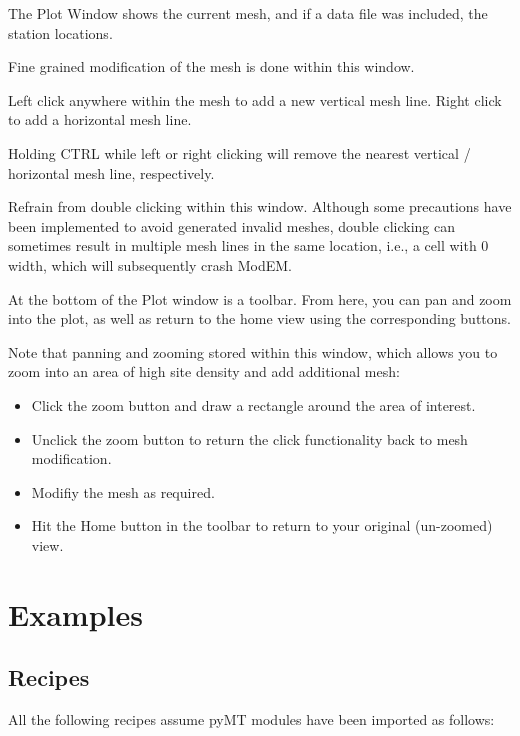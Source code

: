\documentclass[letterpaper,10pt,english]{sphinxmanual}
\begin{document}
The Plot Window shows the current mesh, and if a data file was included, the station locations.

Fine grained modification of the mesh is done within this window.

Left click anywhere within the mesh to add a new vertical mesh line. Right click to add a horizontal mesh line.

Holding CTRL while left or right clicking will remove the nearest vertical / horizontal mesh line, respectively.

Refrain from double clicking within this window. Although some precautions have been implemented to avoid generated invalid meshes, double clicking can sometimes result in multiple mesh lines in the same location, i.e., a cell with 0 width, which will subsequently crash ModEM.

At the bottom of the Plot window is a toolbar. From here, you can pan and zoom into the plot, as well as return to the home view using the corresponding buttons.

Note that panning and zooming  stored within this window, which allows you to zoom into an area of high site density and add additional mesh:
\begin{itemize}
\item {} 
Click the zoom button and draw a rectangle around the area of interest.

\item {} 
Unclick the zoom button to return the click functionality back to mesh modification.

\item {} 
Modifiy the mesh as required.

\item {} 
Hit the Home button in the toolbar to return to your original (un-zoomed) view.

\end{itemize}


\chapter{Examples}
\label{\detokenize{index:examples}}

\section{Recipes}
\label{\detokenize{content/examples/recipes:recipes}}\label{\detokenize{content/examples/recipes:id1}}\label{\detokenize{content/examples/recipes::doc}}
All the following recipes assume pyMT modules have been imported as follows:
\end{document}

